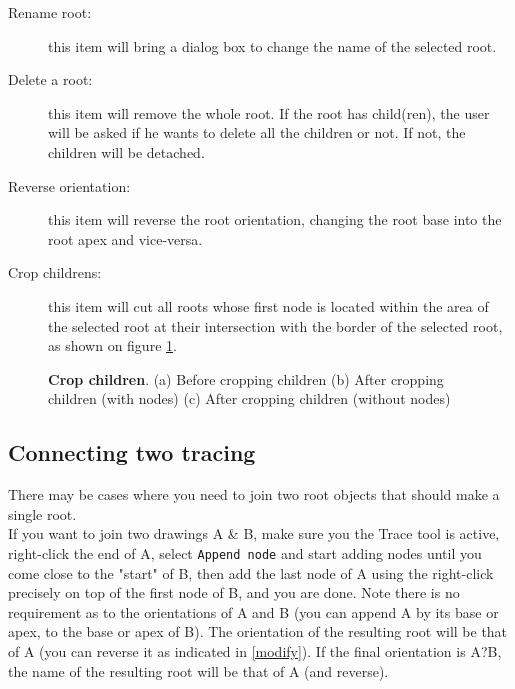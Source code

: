 \documentclass[a4paper,english,10pt]{report}
\begin{document}
\begin{description}
\item[Rename root:] this item will bring a dialog box to change the name of the selected root.

\item[Delete a root:] this item will remove the whole root. If the root has child(ren), the user will be asked if he wants to delete all the children or not. If not, the children will be detached.

\item[Reverse orientation:] this item will reverse the root orientation, changing the root base into the root apex and vice-versa.

\item[Crop childrens:] this item will cut all roots whose first node is located within the area of the selected root at their intersection with the border of the selected root, as shown on figure \ref{crop}.

\end{description}

\begin{figure}[h]
\centering
  \hspace{5mm}   
  \hspace{5mm}   
\caption[Crop children]{\textbf{Crop children}. (a) Before cropping children (b) After cropping children (with nodes) (c) After cropping children (without nodes)}
\label{crop}
\end{figure}

\newpage
\subsection{Connecting two tracing}
\label{connecting}

There may be cases where you need to join two root objects that should make a single root. \\

If you want to join two drawings A \& B, make sure you the Trace tool is active, right-click the end of A, select \verb|Append node| and start adding nodes until you come close to the "start" of B, then add the last node of A using the right-click precisely on top of the first node of B, and you are done.  Note there is no requirement as to the orientations of A and B (you can append A by its base or apex, to the base or apex of B). The orientation of the resulting root will be that of A (you can reverse it as indicated in \ref{modify}). If the final orientation is A?B, the name of the resulting root will be that of A (and reverse).\\
\end{document}
